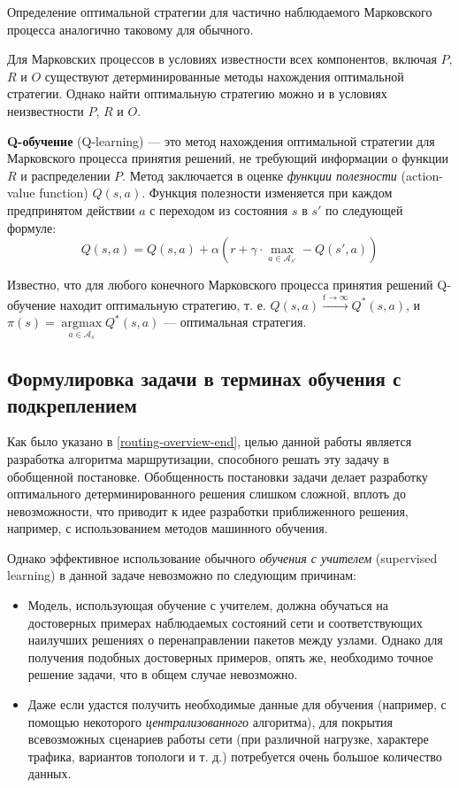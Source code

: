 \documentclass[specification, annotation]{itmo-student-thesis}
\DeclareMathOperator{\argmax}{argmax}
\begin{document}
Определение оптимальной стратегии для частично наблюдаемого Марковского процесса
аналогично таковому для обычного.

Для Марковских процессов в условиях известности всех компонентов, включая $P$,
$R$ и $O$ существуют детерминированные методы нахождения оптимальной стратегии.
Однако найти оптимальную стратегию можно и в условиях неизвестности $P$, $R$ и $O$.

\textbf{Q-обучение} (Q-learning) \cite{q-learning-orig} --- это метод нахождения
оптимальной стратегии для Марковского процесса принятия решений, не требующий
информации о функции $R$ и распределении $P$. Метод заключается в оценке
\textit{функции полезности} (action-value function)
$Q(s,a)$. Функция полезности изменяется при каждом предпринятом действии $a$ с
переходом из состояния $s$ в $s'$ по следующей формуле:
\[
Q(s, a) = Q(s, a) + \alpha \left( r +
\gamma \cdot \max\limits_{a \in \mathcal{A}_{s'}} - Q(s', a) \right)
\]

Известно, что для любого конечного Марковского процесса принятия решений
Q-обучение находит оптимальную стратегию, т. е. $Q(s, a) \xrightarrow{t
  \rightarrow \infty} Q^*(s, a)$, и $\pi(s) = \argmax\limits_{a \in
  \mathcal{A}_s} {Q^*(s, a)}$ --- оптимальная стратегия.

\subsection{Формулировка задачи в терминах обучения с подкреплением}\label{rl-task-formulation}

Как было указано в \ref{routing-overview-end}, целью данной работы является
разработка алгоритма маршрутизации, способного решать эту задачу в обобщенной
постановке. Обобщенность постановки задачи делает разработку оптимального
детерминированного решения слишком сложной, вплоть до невозможности, что
приводит к идее разработки приближенного решения, например, с использованием
методов машинного обучения.

Однако эффективное использование обычного \textit{обучения с учителем} (supervised
learning) в данной задаче невозможно по следующим причинам:

\begin{itemize}
  \item Модель, использующая обучение с учителем, должна обучаться на
    достоверных примерах наблюдаемых состояний сети и соответствующих наилучших
    решениях о перенаправлении пакетов между узлами. Однако для получения
    подобных достоверных примеров, опять же, необходимо точное решение задачи,
    что в общем случае невозможно.
  \item Даже если удастся получить необходимые данные для обучения (например,
    с помощью некоторого \textit{централизованного} алгоритма), для покрытия
    всевозможных сценариев работы сети (при различной нагрузке, характере
    трафика, вариантов топологи и т. д.) потребуется очень большое количество данных.
\end{itemize}
\end{document}
